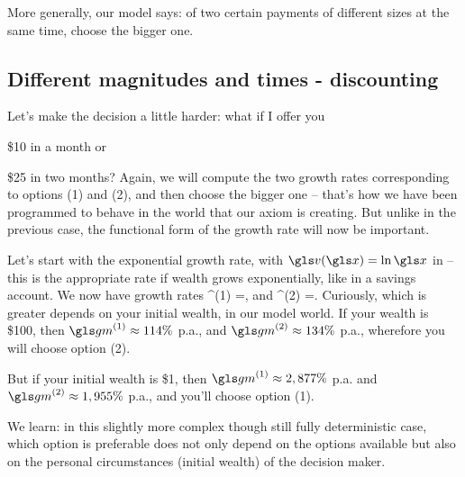 More generally, our model says: of two certain payments of different sizes at the same time, choose the bigger one.

\subsection{Different magnitudes and times - discounting}
Let's make the decision a little harder: what if I offer you 
\bi
\item[(1)] \$10 in a month or 
\item[(2)] \$25 in two months?
\ei
Again, we will compute the two growth rates corresponding to options (1) and (2), and then choose the bigger one -- that's how we have been programmed to behave in the world that our axiom is creating. But unlike in the previous case, the functional form of the growth rate will now be important. 

Let's start with the exponential growth rate, with $\gv(\x)=\ln \x$ in  -- this is the appropriate rate if wealth grows exponentially, like in a savings account.
We now have growth rates
\be
\gm^{(1)} =,
\ee
and
\be
\gm^{(2)} =.
\ee
Curiously, which is greater depends on your initial wealth, in our model world. If your wealth is \$100, then $\gm^{(1)}\approx 114\%$ p.a., and 
$\gm^{(2)}\approx 134\%$ p.a., wherefore you will choose option (2).

But if your initial wealth is \$1, then $\gm^{(1)}\approx 2,877\%$ p.a. and $\gm^{(2)}\approx 1,955\%$ p.a., and you'll choose option (1).

We learn: in this slightly more complex though still fully deterministic case, which option is 
preferable does not only depend on the options available but also on the personal 
circumstances (initial wealth) of the decision maker.

